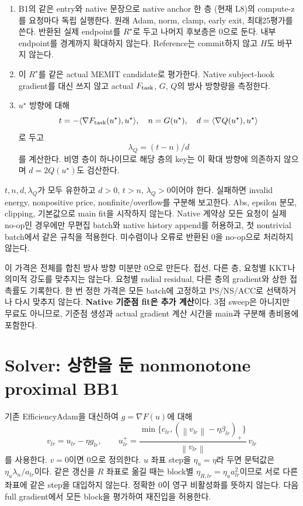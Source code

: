 \documentclass[11pt]{article}
\newcommand{\norm}[1]{\left\lVert #1\right\rVert}
\begin{document}
\begin{enumerate}
 \item B1의 같은 entry와 native 문장으로 native anchor 한 층
 (현재 L8)의 compute-z를 요청마다 독립 실행한다.
 원래 Adam, norm, clamp, early exit, 최대25평가를 쓴다.
 반환된 실제 endpoint를 $R^\star$로 두고 나머지 후보층은 0으로 둔다.
 내부 endpoint를 경계까지 확대하지 않는다. Reference는 commit하지 않고 $H$도 바꾸지 않는다.
 \item 이 $R^\star$를 같은 actual MEMIT candidate로 평가한다.
 Native subject-hook gradient를 대신 쓰지 않고
 actual $F_{\rm task}$, $G$, $Q$의 방사 방향량을 측정한다.
 \item $u^\star$ 방향에 대해
 \[
 t=-\langle\nabla F_{\rm task}(u^\star),u^\star\rangle,\quad
 n=G(u^\star),\quad d=\langle\nabla Q(u^\star),u^\star\rangle
 \]
 로 두고
 \[
 \boxed{\lambda_Q=(t-n)/d}
 \]
 를 계산한다. 비영 층이 하나이므로 해당 층의 key는 이 확대 방향에
 의존하지 않으며 $d=2Q(u^\star)$도 검산한다.
\end{enumerate}
$t,n,d,\lambda_Q$가 모두 유한하고 $d>0$, $t>n$, $\lambda_Q>0$이어야 한다.
실패하면 invalid energy, nonpositive price, nonfinite/overflow를 구분해 보고한다.
Abs, epsilon 분모, clipping, 기본값으로 main fit을 시작하지 않는다.
Native 계약상 모든 요청이 실제 no-op인 경우에만 무편집 batch와
native history append를 허용하고, 첫 nontrivial batch에서 같은 규칙을 적용한다.
미수렴이나 오류로 반환된 0을 no-op으로 처리하지 않는다.

이 가격은 전체를 합친 방사 방향 미분만 0으로 만든다.
접선, 다른 층, 요청별 KKT나 의미적 강도를 맞추지는 않는다.
요청별 radial residual, 다른 층의 gradient와 상한 접촉률도 기록한다.
한 번 정한 가격은 모든 batch에 고정하고 PS/NS/ACC로 선택하거나 다시 맞추지 않는다.
\textbf{Native 기준점 fit은 추가 계산}이다. 3점 sweep은 아니지만 무료도 아니므로,
기준점 생성과 actual gradient 계산 시간을 main과 구분해 총비용에 포함한다.

\section{Solver: 상한을 둔 nonmonotone proximal BB1}
기존 EfficiencyAdam을 대신하여 $g=\nabla F(u)$에 대해
\[
 v_{lr}=u_{lr}-\eta g_{lr},\qquad
 u^+_{lr}=
 \frac{\min\{c_{lr},(\norm{v_{lr}}-\eta\beta_{lr})_+\}}
      {\norm{v_{lr}}}\,v_{lr}
\]
를 사용한다. $v=0$이면 0으로 정의한다.
$u$ 좌표 step을 $\eta_u=\eta$라 두면 문턱값은 $\eta_u\lambda_n/a_{lr}$이다.
같은 갱신을 $R$ 좌표로 옮길 때는 block별
$\eta_{R,lr}=\eta_u a_{lr}^2$이므로 서로 다른 좌표에 같은 step을 대입하지 않는다.
정확한 0이 영구 비활성화를 뜻하지 않는다.
다음 full gradient에서 모든 block을 평가하여 재진입을 허용한다.
\end{document}
